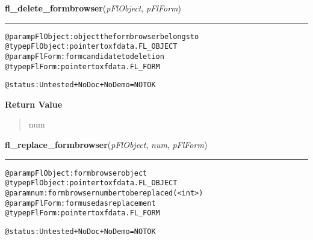     \label{xformslib:flformbrowser:fl_delete_formbrowser}

    \vspace{0.5ex}

\hspace{.8\funcindent}\begin{boxedminipage}{\funcwidth}

    \raggedright \textbf{fl\_delete\_formbrowser}(\textit{pFlObject}, \textit{pFlForm})

    \vspace{-1.5ex}

    \rule{\textwidth}{0.5\fboxrule}
\setlength{\parskip}{2ex}
\begin{alltt}
@param pFlObject: object the formbrowser belongs to
@type pFlObject: pointer to xfdata.FL\_OBJECT
@param pFlForm: form candidate to deletion
              @type pFlForm: pointer to xfdata.FL\_FORM

@status: Untested + NoDoc + NoDemo = NOT OK
\end{alltt}

\setlength{\parskip}{1ex}
      \textbf{Return Value}
    \vspace{-1ex}

      \begin{quote}
      num

      \end{quote}

    \end{boxedminipage}

    \label{xformslib:flformbrowser:fl_replace_formbrowser}

    \vspace{0.5ex}

\hspace{.8\funcindent}\begin{boxedminipage}{\funcwidth}

    \raggedright \textbf{fl\_replace\_formbrowser}(\textit{pFlObject}, \textit{num}, \textit{pFlForm})

    \vspace{-1.5ex}

    \rule{\textwidth}{0.5\fboxrule}
\setlength{\parskip}{2ex}
\begin{alltt}
@param pFlObject: formbrowser object
@type pFlObject: pointer to xfdata.FL\_OBJECT
@param num: formbrowser number to be replaced ({\textless}int{\textgreater})
@param pFlForm: form used as replacement
              @type pFlForm: pointer to xfdata.FL\_FORM

@status: Untested + NoDoc + NoDemo = NOT OK
\end{alltt}

\setlength{\parskip}{1ex}
    \end{boxedminipage}

